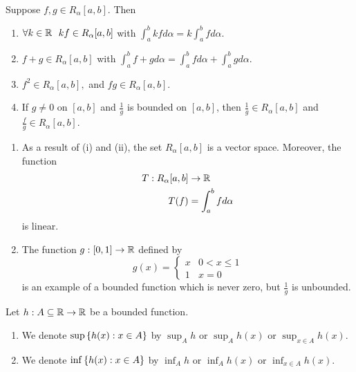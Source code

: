 \begin{theorem} \leavevmode \\
    Suppose $f, g \in R_\alpha [a,b]$. Then
    \begin{enumerate}
        \item $\forall k \in \mathbb{R} ~~kf \in R_\alpha[a,b]$ with $\int_a^b k f d\alpha = k \int_a^b f d \alpha$.
        \item $f + g \in R_\alpha[a,b]$ with $\int_a^b f+g d\alpha = \int_a^b fd\alpha + \int_a^b g d\alpha$.
        \item $f^2 \in R_\alpha[a,b],$ and $fg \in R_\alpha[a,b]$.
        \item If $g \neq 0$ on $[a,b]$ and $\frac{1}{g}$ is bounded on $[a,b]$, then $\frac{1}{g} \in R_\alpha[a,b]$ and $\frac{f}{g}\in R_\alpha[a,b]$.
    \end{enumerate}
\end{theorem}

\begin{remark}
    \begin{enumerate}
        \item[(1)] As a result of (i) and (ii), the set $R_\alpha [a,b]$ is a vector space. Moreover, the function
        \begin{align*}
            T: R_\alpha[a,b] &\to \mathbb{R} \\
            T(f) &= \int_a^b fd\alpha
        \end{align*}
        is linear.

        \item[(2)] The function $g: [0,1] \to \mathbb{R}$ defined by 
        $$g(x) = \begin{cases}
            x & 0 < x \leq 1 \\
            1 & x = 0
        \end{cases}$$
        is an example of a bounded function which is never zero, but $\frac{1}{g}$ is unbounded.
    \end{enumerate}
\end{remark}

\begin{notation}
    Let $h: A \subseteq \mathbb{R} \to \mathbb{R}$ be a bounded function.
    \begin{enumerate}
        \item We denote $\sup \left\{h(x) : x \in A\right\}$ by $\sup_A h$ or $\sup_A h(x)$ or $\sup_{x \in A} h(x).$
        \item We denote $\inf \left\{h(x): x \in A\right\}$ by $\inf_A h$ or $\inf_A h(x)$ or $\inf_{x \in A} h(x).$
    \end{enumerate}
\end{notation}

